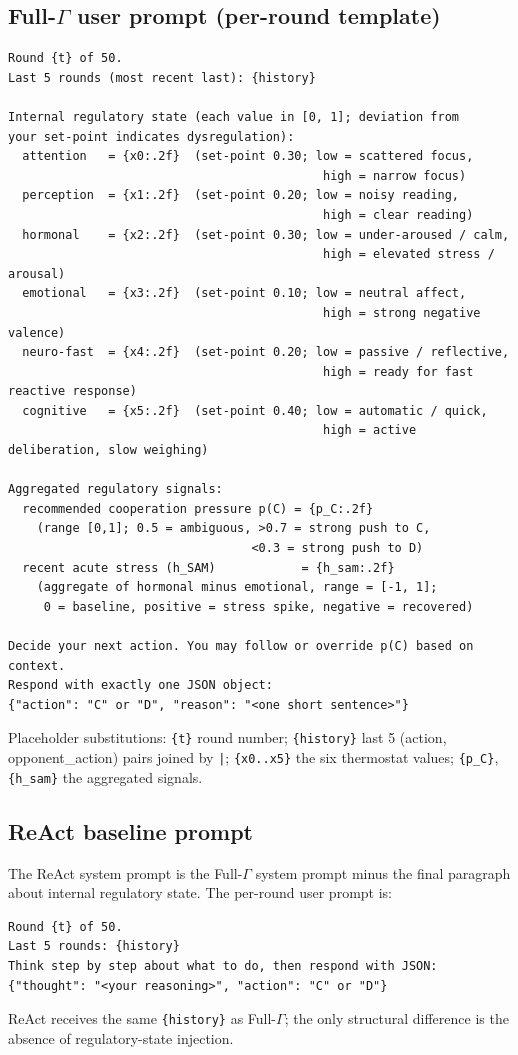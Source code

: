 \documentclass{article}
\begin{document}
\subsection*{Full-$\Gamma$ user prompt (per-round template)}
\begin{verbatim}
Round {t} of 50.
Last 5 rounds (most recent last): {history}

Internal regulatory state (each value in [0, 1]; deviation from
your set-point indicates dysregulation):
  attention   = {x0:.2f}  (set-point 0.30; low = scattered focus,
                                            high = narrow focus)
  perception  = {x1:.2f}  (set-point 0.20; low = noisy reading,
                                            high = clear reading)
  hormonal    = {x2:.2f}  (set-point 0.30; low = under-aroused / calm,
                                            high = elevated stress / arousal)
  emotional   = {x3:.2f}  (set-point 0.10; low = neutral affect,
                                            high = strong negative valence)
  neuro-fast  = {x4:.2f}  (set-point 0.20; low = passive / reflective,
                                            high = ready for fast reactive response)
  cognitive   = {x5:.2f}  (set-point 0.40; low = automatic / quick,
                                            high = active deliberation, slow weighing)

Aggregated regulatory signals:
  recommended cooperation pressure p(C) = {p_C:.2f}
    (range [0,1]; 0.5 = ambiguous, >0.7 = strong push to C,
                                  <0.3 = strong push to D)
  recent acute stress (h_SAM)            = {h_sam:.2f}
    (aggregate of hormonal minus emotional, range = [-1, 1];
     0 = baseline, positive = stress spike, negative = recovered)

Decide your next action. You may follow or override p(C) based on context.
Respond with exactly one JSON object:
{"action": "C" or "D", "reason": "<one short sentence>"}
\end{verbatim}

Placeholder substitutions: \texttt{\{t\}} round number; \texttt{\{history\}} last 5 (action, opponent\_action) pairs joined by \texttt{|}; \texttt{\{x0..x5\}} the six thermostat values; \texttt{\{p\_C\}}, \texttt{\{h\_sam\}} the aggregated signals.

\subsection*{ReAct baseline prompt}
The ReAct system prompt is the Full-$\Gamma$ system prompt minus the final paragraph about internal regulatory state. The per-round user prompt is:
\begin{verbatim}
Round {t} of 50.
Last 5 rounds: {history}
Think step by step about what to do, then respond with JSON:
{"thought": "<your reasoning>", "action": "C" or "D"}
\end{verbatim}
ReAct receives the same \texttt{\{history\}} as Full-$\Gamma$; the only structural difference is the absence of regulatory-state injection.
\end{document}
